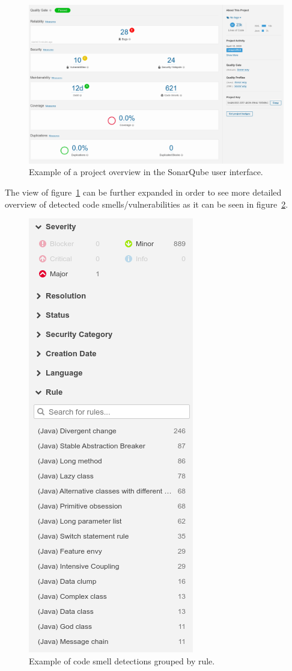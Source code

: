 \begin{figure}
    \includegraphics[scale=0.35]{figures/project_managers_1.png}
    \caption{Example of a project overview in the SonarQube user interface.}
    \label{fig:spm_1}
\end{figure}

The view of figure~\ref{fig:spm_1} can be further expanded in order to see more detailed overview of detected
code smells/vulnerabilities as it can be seen in figure~\ref{fig:spm_2}.

\begin{figure}
    \centering
    \includegraphics[scale=0.6]{figures/pm_2_1.png}
    \caption{Example of code smell detections grouped by rule.}
    \label{fig:spm_2}
\end{figure}

